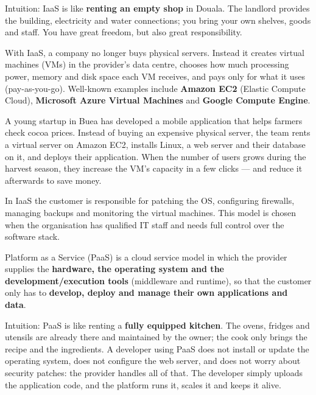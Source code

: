 \documentclass[11pt]{article}
\newcommand{\cle}[1]{{\popxbold\color{popdark}#1}}
\newcounter{popsec}
\newcounter{popsub}
\newcommand{\courssub}[1]{%
  \stepcounter{popsub}%
  \par\vspace{9pt}\noindent{\popxbold\fontsize{11.5}{13}\selectfont\color{popink}{\color{poporange}\thepopsec.\thepopsub}\hspace{6pt}#1}\par\nopagebreak\vspace{4pt}
}
\begin{document}
Intuition: IaaS is like \textbf{renting an empty shop} in Douala. The landlord provides the building, electricity and water connections; you bring your own shelves, goods and staff. You have great freedom, but also great responsibility.

With IaaS, a company no longer buys physical servers. Instead it creates \cle{virtual machines} (VMs) in the provider's data centre, chooses how much processing power, memory and disk space each VM receives, and pays only for what it uses (pay-as-you-go). Well-known examples include \textbf{Amazon EC2} (Elastic Compute Cloud), \textbf{Microsoft Azure Virtual Machines} and \textbf{Google Compute Engine}.

\begin{exemplebox}
A young startup in Buea has developed a mobile application that helps farmers check cocoa prices. Instead of buying an expensive physical server, the team rents a virtual server on Amazon EC2, installs Linux, a web server and their database on it, and deploys their application. When the number of users grows during the harvest season, they increase the VM's capacity in a few clicks --- and reduce it afterwards to save money.
\end{exemplebox}

\begin{attention}
In IaaS the customer is responsible for patching the OS, configuring firewalls, managing backups and monitoring the virtual machines. This model is chosen when the organisation has qualified IT staff and needs full control over the software stack.
\end{attention}

\courssub{PaaS --- Platform as a Service}

\begin{definition}[PaaS]
\cle{Platform as a Service (PaaS)} is a cloud service model in which the provider supplies the \textbf{hardware, the operating system and the development/execution tools} (middleware and runtime), so that the customer only has to \textbf{develop, deploy and manage their own applications and data}.
\end{definition}

Intuition: PaaS is like renting a \textbf{fully equipped kitchen}. The ovens, fridges and utensils are already there and maintained by the owner; the cook only brings the recipe and the ingredients. A developer using PaaS does not install or update the operating system, does not configure the web server, and does not worry about security patches: the provider handles all of that. The developer simply uploads the application code, and the platform runs it, scales it and keeps it alive.
\end{document}
